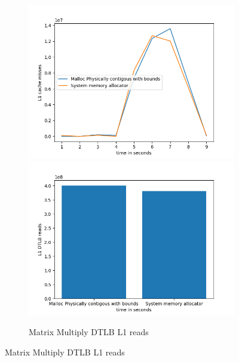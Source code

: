 \begin{figure}
  \begin{subfigure}{\linewidth}
    \includegraphics[width=.5\linewidth]{BenchmarkRuns/MatrixMultiply/l1_1000_MatrixMultiply.png}\hfill
    \includegraphics[width=.5\linewidth]{BenchmarkRuns/MatrixMultiply/l1_tlb_200_MatrixMultiply.png}
  \caption{Matrix Multiply DTLB L1 reads}
  \end{subfigure}\par\medskip
\end{figure}

